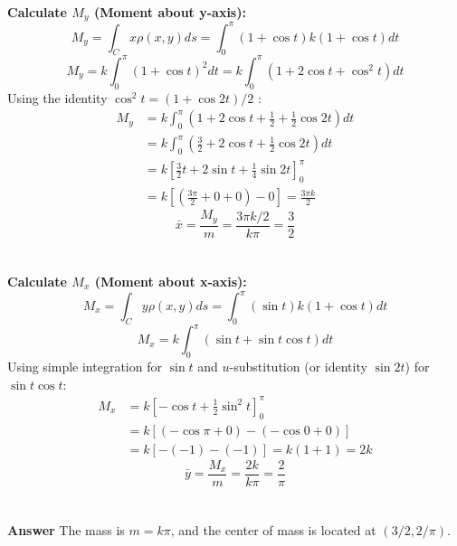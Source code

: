 \documentclass{article}
\begin{document}
\\
\textbf{Calculate $M_{y}$ (Moment about y-axis):}
\[
	M_{y} = \int_{C}{x \rho(x,y)ds} = \int_{0}^{\pi}{(1 + \cos{t}) k(1 + \cos{t})dt}
\]
\[
	M_{y} = k \int_{0}^{\pi}{(1 + \cos{t})^{2}dt} = k \int_{0}^{\pi}{(1 + 2\cos{t} + \cos^{2}{t})dt}
\]
Using the identity $\cos^{2}{t} = (1 + \cos{2t})/2$ :
\begin{align*}
	M_y & = k \int_{0}^{\pi}{\left( 1 + 2\cos{t} + \frac{1}{2} + \frac{1}{2}\cos{2t} \right)dt} \\
	    & = k \int_{0}^{\pi}{\left( \frac{3}{2} + 2\cos{t} + \frac{1}{2}\cos{2t} \right)dt}     \\
	    & = k \left[\frac{3}{2}t + 2\sin{t} + \frac{1}{4}\sin{2t} \right]_{0}^{\pi}             \\
	    & = k \left[\left(\frac{3\pi}{2} + 0 + 0\right) - 0 \right] = \frac{3\pi k}{2}
\end{align*}
\[
	\bar{x} = \frac{M_y}{m} = \frac{3\pi k / 2}{k\pi} = \frac{3}{2}
\]
\\
\\
\textbf{Calculate $M_{x}$ (Moment about x-axis):}
\[
	M_{x} = \int_{C}{y \rho(x,y)ds} = \int_{0}^{\pi}{(\sin t) k(1 + \cos t)dt}
\]
\[
	M_{x} = k \int_{0}^{\pi}{(\sin t + \sin t \cos t)dt}
\]
Using simple integration for $\sin{t}$ and $u$-substitution (or identity
$\sin{2t}$) for $\sin{t} \cos{t}$:
\begin{align*}
	M_{x} & = k \left[ -\cos{t} + \frac{1}{2}\sin^{2}{t} \right]_{0}^{\pi} \\
	      & = k \left[ (-\cos{\pi} + 0) - (-\cos{0} + 0) \right]           \\
	      & = k \left[ -(-1) - (-1) \right] = k(1 + 1) = 2k
\end{align*}
\[
	\bar{y} = \frac{M_{x}}{m} = \frac{2k}{k\pi} = \frac{2}{\pi}
\]
\\
\\
\textbf{Answer}
The mass is $m = k\pi$, and the center of mass is located at
$\left(3/2, 2/\pi\right)$.

\pagebreak

\end{document}
